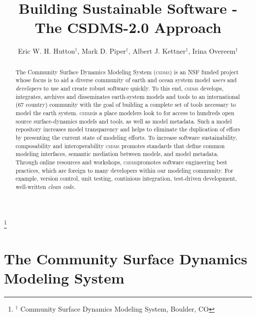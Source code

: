\documentclass[11pt, oneside]{amsart}
\DeclareRobustCommand{\csdms}{\textsc{csdms}}
\begin{document}
\title[]{Building Sustainable Software - The CSDMS-2.0 Approach}

\author{
  Eric W. H. Hutton$^{\dag}$,
  Mark D. Piper$^{\dag}$,
  Albert J. Kettner$^{\dag}$,
  Irina Overeem$^{\dag}$}

\thanks{{}$^{\dag}$ Community Surface Dynamics Modeling System, Boulder, CO}

\begin{abstract}

The Community Surface Dynamics Modeling System (\csdms{}) is an NSF funded
project whose focus is to aid a diverse community of earth and ocean system
model \emph{users} and \emph{developers} to use and create robust software
quickly.  To this end, \csdms{} develops, integrates, archives and disseminates
earth-system models and tools to an international (67 country) community
with the goal of building a complete set of tools necessary to model the
earth system. \csdms is a place modelers look to for access to hundreds open
source surface-dynamics models and tools, as well as model metadata. Such a
model repository increases model transparency and helps to eliminate the
duplication of effors by presenting the current state of modeling efforts.
To increase software sustainability, composability and interoperability \csdms
promotes standards that define common modeling interfaces, semantic mediation
between models, and model metadata. Through online resources and workshops,
\csdms promotes software engineering best practices, which are foreign to many
developers within our modeling community. For example, version control, unit
testing, continious integration, test-driven development, well-written
\emph{clean code}.

\end{abstract}

\maketitle

\section{The Community Surface Dynamics Modeling System}
\end{document}
